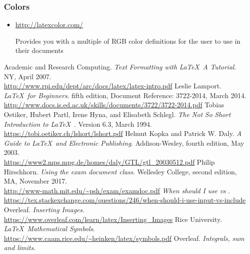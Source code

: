 \documentclass[12pt,hidelinks]{article}
\begin{document}
		\subsubsection{Colors}
			\begin{itemize}
			\item \url{http://latexcolor.com/}
				\begin{absquote}
					Provides you with a multiple of RGB color definitions for the user to use in their documents
				\end{absquote}
			\end{itemize}
\newpage
	\begin{thebibliography}{17}
	\vspace{10.5cm}
		 Academic and Research Computing. \textit{Text Formatting with \LaTeX\ A Tutorial}. NY, April 2007.\\
				\url{http://www.rpi.edu/dept/arc/docs/latex/latex-intro.pdf}
		 Leslie Lamport. \textit{\LaTeX\ for Beginners}.  fifth edition, Document Reference: 3722-2014, March 2014.\\
				\url{http://www.docs.is.ed.ac.uk/skills/documents/3722/3722-2014.pdf}
		 Tobias Oetiker, Hubert Partl, Irene Hyna, and Elisabeth Schlegl. \textit{The Not So Short Introduction to \LaTeX\ }. Version 6.3, March 1994.\\
				\url{https://tobi.oetiker.ch/lshort/lshort.pdf}
		 Helmut Kopka and Patrick W. Daly. \textit{A Guide to \LaTeX\ and Electronic Publishing}. Addison-Wesley, fourth edition, May 2003.\\
				\url{https://www2.mps.mpg.de/homes/daly/GTL/gtl_20030512.pdf}
		 Philip Hirschhorn. \textit{Using the exam document class}. Wellesley College, second edition, MA, November 2017.\\
				\url{http://www-math.mit.edu/~psh/exam/examdoc.pdf}
		 \textit{When should I use  vs }.\\
				\url{https://tex.stackexchange.com/questions/246/when-should-i-use-input-vs-include}		
		 Overleaf. \textit{Inserting Images}.\\
				\url{https://www.overleaf.com/learn/latex/Inserting_Images}
		 Rice University. \textit{\LaTeX\ Mathematical Symbols}.\\
			\url{https://www.caam.rice.edu/~heinken/latex/symbols.pdf}
		 Overleaf. \textit{Integrals, sum and limits}.\\

\end{thebibliography}
\end{document}
